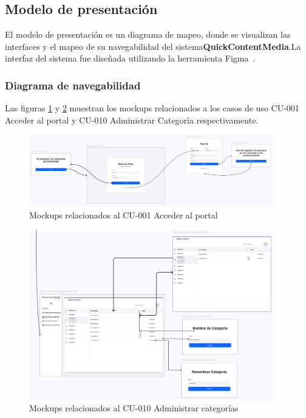 
\subsection{Modelo de presentación}
El modelo de presentación es un diagrama de mapeo, donde se visualizan las interfaces y el mapeo de su navegabilidad del sistema\textbf{QuickContentMedia}.La interfaz del sistema fue diseñada utilizando la herramienta {Figma}~\cite{figma2024}.
\subsubsection{Diagrama de navegabilidad}
Las figuras \ref{fig:mockups} y \ref{fig:mockups2} muestran los mockups relacionados a los casos de uso CU-001 Acceder al portal y CU-010 Administrar Categoría respectivamente.
\begin{figure}[H]
    \centering
    \includegraphics[width=0.95\textwidth]{Media/3_Analisis/3_ModeloDeRequisitos/MK_AccesoAlPortal.png}
    \caption{Mockups relacionados al CU-001 Acceder al portal} 
    \label{fig:mockups}
\end{figure}

\begin{figure}[H]
    \centering
    \includegraphics[width=0.95\textwidth]{Media/3_Analisis/3_ModeloDeRequisitos/MK_gestionarCategorias.png}
    \caption{Mockups relacionados al CU-010 Administrar categorías} 
    \label{fig:mockups2}
\end{figure}

